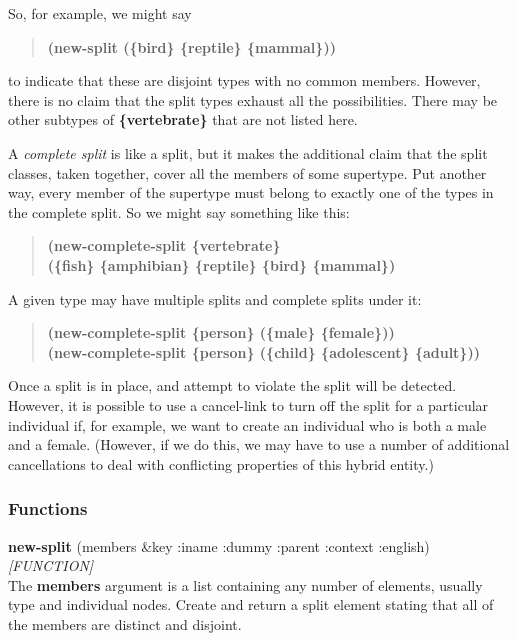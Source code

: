 \documentclass[titlepage,twoside,openright,11pt]{article}
\begin{document}
So, for example, we might say

\begin{quote}
\textbf{(new-split \textquotesingle(\{bird\} \{reptile\} \{mammal\}))}
\end{quote}

to indicate that these are disjoint types with no common members.
However, there is no claim that the split types exhaust all the
possibilities. There may be other subtypes of \textbf{\{vertebrate\}}
that are not listed here.

A \emph{complete split} is like a split, but it makes the additional
claim that the split classes, taken together, cover all the members of
some supertype. Put another way, every member of the supertype must
belong to exactly one of the types in the complete split. So we might
say something like this:

\begin{quote}
\textbf{(new-complete-split \{vertebrate\}\\
\textquotesingle(\{fish\} \{amphibian\} \{reptile\} \{bird\}
\{mammal\})}
\end{quote}

A given type may have multiple splits and complete splits under it:

\begin{quote}
\textbf{(new-complete-split \{person\} \textquotesingle(\{male\}
\{female\}))\\
(new-complete-split \{person\} \textquotesingle(\{child\} \{adolescent\}
\{adult\}))}
\end{quote}

Once a split is in place, and attempt to violate the split will be
detected. However, it is possible to use a cancel-link to turn off the
split for a particular individual if, for example, we want to create an
individual who is both a male and a female. (However, if we do this, we
may have to use a number of additional cancellations to deal with
conflicting properties of this hybrid entity.)

\subsubsection{Functions}\label{functions-10}

\textbf{new-split} (members \&key :iname :dummy :parent :context
:english) \emph{{[}FUNCTION{]}}\\
The \textbf{members} argument is a list containing any number of
elements, usually type and individual nodes. Create and return a split
element stating that all of the members are distinct and disjoint.
\end{document}
